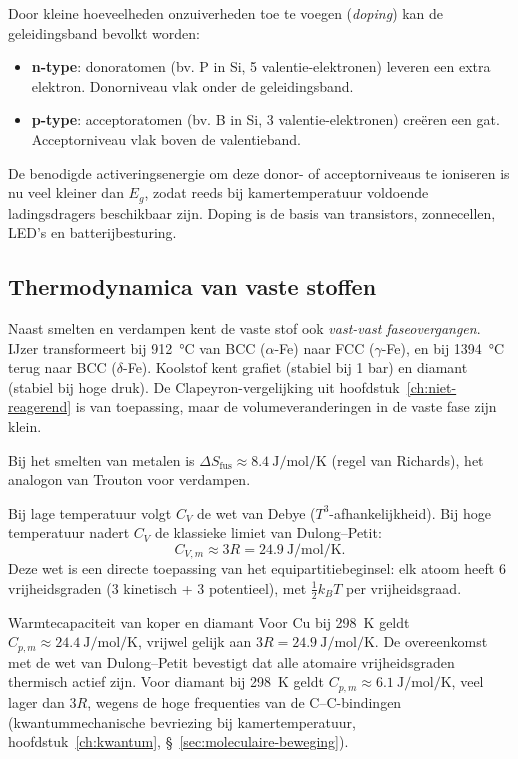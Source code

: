 Door kleine hoeveelheden onzuiverheden toe te voegen (\emph{doping}) kan de geleidingsband bevolkt worden:
\begin{itemize}
\item \textbf{n-type}: donoratomen (bv. P in Si, 5 valentie-elektronen) leveren een extra elektron. Donorniveau vlak onder de geleidingsband.
\item \textbf{p-type}: acceptoratomen (bv. B in Si, 3 valentie-elektronen) cre\"eren een gat. Acceptorniveau vlak boven de valentieband.
\end{itemize}
De benodigde activeringsenergie om deze donor- of acceptorniveaus te ioniseren is nu veel kleiner dan $E_g$, zodat reeds bij kamertemperatuur voldoende ladingsdragers beschikbaar zijn. Doping is de basis van transistors, zonnecellen, LED's en batterijbesturing.

\subsection{Thermodynamica van vaste stoffen}

\label{sec:faseovergang-vast}
Naast smelten en verdampen kent de vaste stof ook \emph{vast-vast faseovergangen}. IJzer transformeert bij \SI{912}{\celsius} van BCC ($\alpha$-Fe) naar FCC ($\gamma$-Fe), en bij \SI{1394}{\celsius} terug naar BCC ($\delta$-Fe). Koolstof kent grafiet (stabiel bij 1 bar) en diamant (stabiel bij hoge druk). De Clapeyron-vergelijking uit hoofdstuk~\ref{ch:niet-reagerend} is van toepassing, maar de volumeveranderingen in de vaste fase zijn klein.

Bij het smelten van metalen is $\Delta S_{\text{fus}} \approx \SI{8.4}{\joule\per\mole\per\kelvin}$ (regel van Richards), het analogon van Trouton voor verdampen.

Bij lage temperatuur volgt $C_V$ de wet van Debye ($T^3$-afhankelijkheid). Bij hoge temperatuur nadert $C_V$ de klassieke limiet van Dulong--Petit:
\begin{equation}
C_{V,m} \approx 3R = \SI{24.9}{\joule\per\mole\per\kelvin}.
\end{equation}
Deze wet is een directe toepassing van het equipartitiebeginsel: elk atoom heeft 6 vrijheidsgraden (3 kinetisch + 3 potentieel), met $\tfrac{1}{2}k_BT$ per vrijheidsgraad.

\begin{voorbeeld}{Warmtecapaciteit van koper en diamant}
Voor Cu bij \SI{298}{\kelvin} geldt $C_{p,m} \approx \SI{24.4}{\joule\per\mole\per\kelvin}$, vrijwel gelijk aan $3R = \SI{24.9}{\joule\per\mole\per\kelvin}$. De overeenkomst met de wet van Dulong--Petit bevestigt dat alle atomaire vrijheidsgraden thermisch actief zijn. Voor diamant bij \SI{298}{\kelvin} geldt $C_{p,m} \approx \SI{6.1}{\joule\per\mole\per\kelvin}$, veel lager dan $3R$, wegens de hoge frequenties van de C--C-bindingen (kwantummechanische bevriezing bij kamertemperatuur, hoofdstuk~\ref{ch:kwantum}, \S~\ref{sec:moleculaire-beweging}).
\end{voorbeeld}

